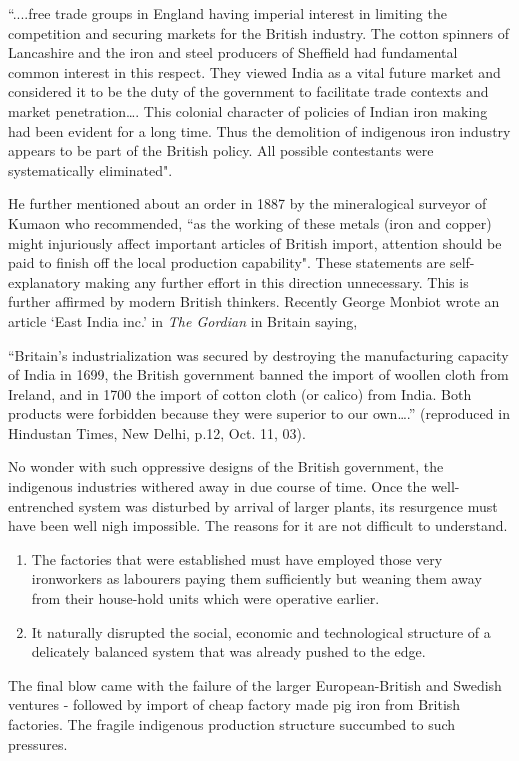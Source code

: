  “....free trade groups in England having imperial interest in limiting the competition and securing markets for the British industry. The cotton spinners of Lancashire and the iron and steel producers of Sheffield had fundamental common interest in this respect. They viewed India as a vital future market and considered it to be the duty of the government to facilitate trade contexts and market penetration…. This colonial character of policies of Indian iron making had been evident for a long time. Thus the demolition of indigenous iron industry appears to be part of the British policy. All possible contestants were systematically eliminated". 

He further mentioned about an order in 1887 by the mineralogical surveyor of Kumaon who recommended, “as the working of these metals (iron and copper) might injuriously affect important articles of British import, attention should be paid to finish off the local production capability". These statements are self-explanatory making any further effort in this direction unnecessary. This is further affirmed by modern British thinkers. Recently George Monbiot wrote an article ‘East India inc.’ in {\it The Gordian} in Britain saying, 

“Britain’s industrialization was secured by destroying the manufacturing capacity of India in 1699, the British government banned the import of woollen cloth from Ireland, and in 1700 the import of cotton cloth (or calico) from India. Both products were forbidden because they were superior to our own….” (reproduced in Hindustan Times, New Delhi, p.12, Oct. 11, 03). 

No wonder with such oppressive designs of the British government, the indigenous industries withered away in due course of time. Once the well-entrenched system was disturbed by arrival of larger plants, its resurgence must have been well nigh impossible. The reasons for it are not difficult to understand.

\begin{enumerate}
\item The factories that were established must have employed those very ironworkers as labourers paying them sufficiently but weaning them away from their house-hold units which were operative earlier.
\item It naturally disrupted the social, economic and technological structure of a delicately balanced system that was already pushed to the edge.
\end{enumerate}

The final blow came with the failure of the larger European-British and Swedish ventures - followed by import of cheap factory made pig iron from British factories. The fragile indigenous production structure succumbed to such pressures.

